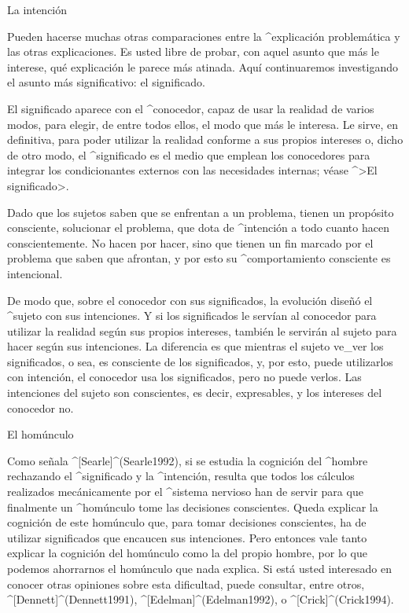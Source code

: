 \Section La intención

Pueden hacerse muchas otras comparaciones entre la ^{explicación
problemática} y las otras explicaciones. Es usted libre de probar, con
aquel asunto que más le interese, qué explicación le parece más atinada.
Aquí continuaremos investigando el asunto más significativo: el
significado.

El significado aparece con el ^{conocedor}, capaz de usar la realidad de
varios modos, para elegir, de entre todos ellos, el modo que más le
interesa. Le sirve, en definitiva, para poder utilizar la realidad
conforme a sus propios intereses o, dicho de otro modo, el
^{significado} es el medio que emplean los conocedores para integrar los
condicionantes externos con las necesidades internas; véase ^>El
significado>.

Dado que los sujetos saben que se enfrentan a un problema, tienen un
propósito consciente, solucionar el problema, que dota de ^{intención} a
todo cuanto hacen conscientemente. No hacen por hacer, sino que tienen
un fin marcado por el problema que saben que afrontan, y por esto su
^{comportamiento} consciente es intencional.

De modo que, sobre el conocedor con sus significados, la evolución
diseñó el ^{sujeto} con sus intenciones. Y si los significados le
servían al conocedor para utilizar la realidad según sus propios
intereses, también le servirán al sujeto para hacer según sus
intenciones. La diferencia es que mientras el sujeto ve_{ver} los
significados, o sea, es consciente de los significados, y, por esto,
puede utilizarlos con intención, el conocedor usa los significados, pero
no puede verlos. Las intenciones del sujeto son conscientes, es decir,
expresables, y los intereses del conocedor no.


\Section El homúnculo

Como señala ^[Searle]^(Searle1992), si se estudia la cognición del
^{hombre} rechazando el ^{significado} y la ^{intención}, resulta que
todos los cálculos realizados mecánicamente por el ^{sistema nervioso}
han de servir para que finalmente un ^{homúnculo} tome las decisiones
conscientes. Queda explicar la cognición de este homúnculo que, para
tomar decisiones conscientes, ha de utilizar significados que encaucen
sus intenciones. Pero entonces vale tanto explicar la cognición del
homúnculo como la del propio hombre, por lo que podemos ahorrarnos el
homúnculo que nada explica. Si está usted interesado en conocer otras
opiniones sobre esta dificultad, puede consultar, entre otros,
 ^[Dennett]^(Dennett1991),
 ^[Edelman]^(Edelman1992), o
 ^[Crick]^(Crick1994).

